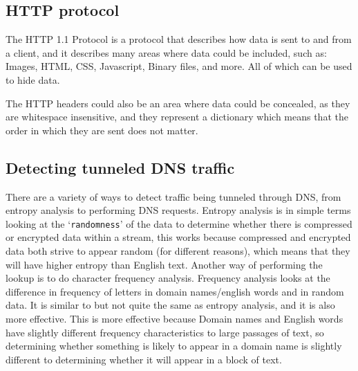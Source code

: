 \subsection{HTTP protocol}
The HTTP 1.1 Protocol\cite{rfc2616} is a protocol that describes how data is sent to and from a client, and it describes many areas where data could be included, such as:
Images,
HTML,
CSS,
Javascript,
Binary files,
and more.
All of which can be used to hide data.\par
The HTTP headers could also be an area where data could be concealed, as they are whitespace insensitive, and they represent a dictionary which means that the order in which they are sent does not matter\cite{rfc2616}.

\subsection{Detecting tunneled DNS traffic}
There are a variety of ways to detect traffic being tunneled through DNS, from entropy analysis to performing DNS requests\cite{detectingdns}.
Entropy analysis is in simple terms looking at the `\texttt{randomness}' of the data to determine whether there is compressed or encrypted data within a stream, this works because compressed and encrypted data both strive to appear random (for different reasons), which means that they will have higher entropy than English text.
Another way of performing the lookup is to do character frequency analysis\cite{freqanal}.
Frequency analysis looks at the difference in frequency of letters in domain names/english words and in random data. It is similar to but not quite the same as entropy analysis, and it is also more effective. 
This is more effective because Domain names and English words have slightly different frequency characteristics to large passages of text, so determining whether something is likely to appear in a domain name is slightly different to determining whether it will appear in a block of text.
